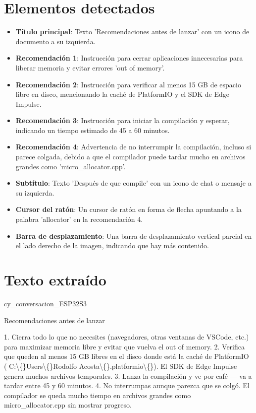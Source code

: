\documentclass[11pt,a4paper]{article}
\begin{document}
\section*{Elementos detectados}
\begin{itemize}[leftmargin=1.5em, itemsep=2pt]
  \item \textbf{Título principal}: Texto 'Recomendaciones antes de lanzar' con un icono de documento a su izquierda.
  \item \textbf{Recomendación 1}: Instrucción para cerrar aplicaciones innecesarias para liberar memoria y evitar errores 'out of memory'.
  \item \textbf{Recomendación 2}: Instrucción para verificar al menos 15 GB de espacio libre en disco, mencionando la caché de PlatformIO y el SDK de Edge Impulse.
  \item \textbf{Recomendación 3}: Instrucción para iniciar la compilación y esperar, indicando un tiempo estimado de 45 a 60 minutos.
  \item \textbf{Recomendación 4}: Advertencia de no interrumpir la compilación, incluso si parece colgada, debido a que el compilador puede tardar mucho en archivos grandes como 'micro\_allocator.cpp'.
  \item \textbf{Subtítulo}: Texto 'Después de que compile' con un icono de chat o mensaje a su izquierda.
  \item \textbf{Cursor del ratón}: Un cursor de ratón en forma de flecha apuntando a la palabra 'allocator' en la recomendación 4.
  \item \textbf{Barra de desplazamiento}: Una barra de desplazamiento vertical parcial en el lado derecho de la imagen, indicando que hay más contenido.
\end{itemize}

\section*{Texto extraído}
cy\_conversacion\_ESP32S3

Recomendaciones antes de lanzar

1. Cierra todo lo que no necesites (navegadores, otras ventanas de VSCode, etc.) para maximizar
memoria libre y evitar que vuelva el out of memory.
2. Verifica que queden al menos 15 GB libres en el disco donde está la caché de PlatformIO (
C:\textbackslash\{\}Users\textbackslash\{\}Rodolfo Acosta\textbackslash\{\}.platformio\textbackslash\{\}). El SDK de Edge Impulse genera muchos archivos
temporales.
3. Lanza la compilación y ve por café --- va a tardar entre 45 y 60 minutos.
4. No interrumpas aunque parezca que se colgó. El compilador se queda mucho tiempo en
archivos grandes como micro\_allocator.cpp sin mostrar progreso.
\end{document}
